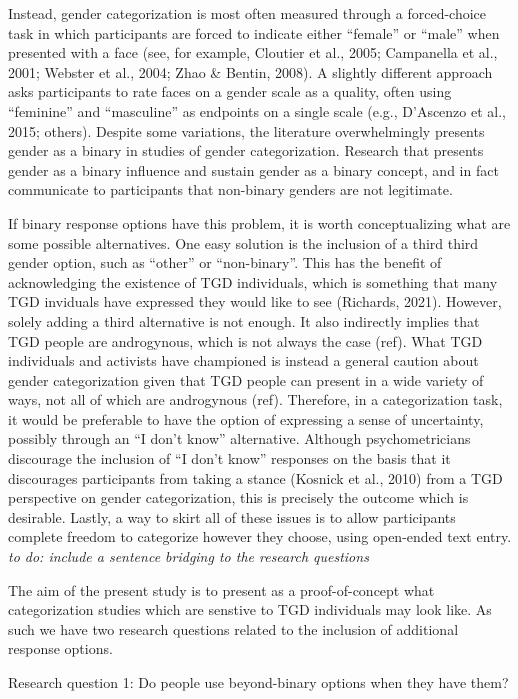 \documentclass[
  man]{apa7}
\begin{document}
Instead, gender categorization is most often measured through a forced-choice task in which participants are forced to indicate either ``female'' or ``male'' when presented with a face (see, for example, Cloutier et al., 2005; Campanella et al., 2001; Webster et al., 2004; Zhao \& Bentin, 2008). A slightly different approach asks participants to rate faces on a gender scale as a quality, often using ``feminine'' and ``masculine'' as endpoints on a single scale (e.g., D'Ascenzo et al., 2015; others). Despite some variations, the literature overwhelmingly presents gender as a binary in studies of gender categorization. Research that presents gender as a binary influence and sustain gender as a binary concept, and in fact communicate to participants that non-binary genders are not legitimate.

If binary response options have this problem, it is worth conceptualizing what are some possible alternatives. One easy solution is the inclusion of a third third gender option, such as ``other'' or ``non-binary''. This has the benefit of acknowledging the existence of TGD individuals, which is something that many TGD inviduals have expressed they would like to see (Richards, 2021). However, solely adding a third alternative is not enough. It also indirectly implies that TGD people are androgynous, which is not always the case (ref). What TGD individuals and activists have championed is instead a general caution about gender categorization given that TGD people can present in a wide variety of ways, not all of which are androgynous (ref). Therefore, in a categorization task, it would be preferable to have the option of expressing a sense of uncertainty, possibly through an ``I don't know'' alternative. Although psychometricians discourage the inclusion of ``I don't know'' responses on the basis that it discourages participants from taking a stance (Kosnick et al., 2010) from a TGD perspective on gender categorization, this is precisely the outcome which is desirable. Lastly, a way to skirt all of these issues is to allow participants complete freedom to categorize however they choose, using open-ended text entry. \emph{to do: include a sentence bridging to the research questions}

The aim of the present study is to present as a proof-of-concept what categorization studies which are senstive to TGD individuals may look like. As such we have two research questions related to the inclusion of additional response options.

Research question 1: Do people use beyond-binary options when they have them?
\end{document}
